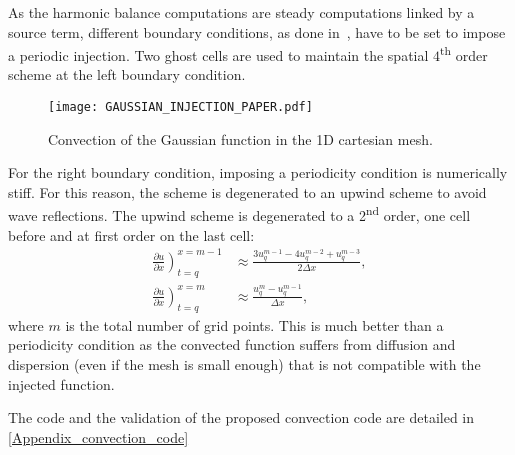 As the harmonic balance computations are steady computations linked 
by a source term, 
different boundary conditions, as done in~\cite{Dufour2010},
have to be set to impose a periodic injection. Two ghost cells
are used to maintain the spatial $4$\textsuperscript{th} order scheme 
at the left
boundary condition.
\begin{figure}[htbp]
  \begin{center}
    \texttt{[image: GAUSSIAN\_INJECTION\_PAPER.pdf]}
  \end{center}
  \caption{Convection of the Gaussian function in the 1D cartesian mesh.}
  \label{fig:convection_injection_paper}
\end{figure}
For the right boundary condition, imposing a periodicity condition is
numerically stiff. For this reason, the scheme is degenerated 
to an upwind scheme to avoid wave reflections. The upwind scheme is degenerated to
a 2\textsuperscript{nd} order, one cell before and at first order on the 
last cell:
\begin{align}
    \left. \frac{\partial u}{\partial x} \right)_{t=q}^{x=m-1} &\approx 
    \frac{3 u^{m-1}_{q} - 4 u^{m-2}_{q} + u^{m-3}_{q}}{2\Delta x}, \\
    \left. \frac{\partial u}{\partial x} \right)_{t=q}^{x=m} &\approx 
    \frac{u^{m}_{q} - u^{m-1}_{q}}{\Delta x},
\label{eq:upwind_scheme}
\end{align}
where $m$ is the total number of grid points. This is much better than a periodicity
condition as the convected function suffers from diffusion and dispersion (even if the
mesh is small enough) that is not compatible with the injected function.

The code and the validation of the proposed convection code are detailed in
\ref{Appendix_convection_code}





